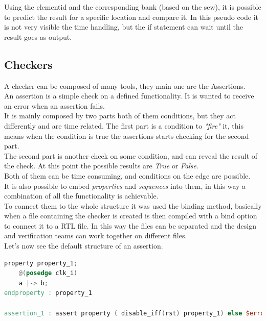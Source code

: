 Using the element\+id and the corresponding bank (based on the sew), it is possible to predict the result for a specific location and compare it. In this pseudo code it is not very visible the time handling, but the if statement can wait until the result goes as output.


\subsection{Checkers}
A checker can be composed of many tools, they main one are the Assertions.\\

An assertion is a simple check on a defined functionality. It is wanted to receive an error when an assertion fails.\\
It is mainly composed by two parts both of them conditions, but they act differently and are time related. The first part is a condition to \textit{"fire"} it, this means when the condition is true the assertions starts checking for the second part.\cite{verification-book-2016}\\

The second part is another check on some condition, and can reveal the result of the check. At this point the possible results are \textit{True} or \textit{False}.\\

Both of them can be time consuming, and conditions on the edge are possible.\\
It is also possible to embed \textit{properties} and \textit{sequences} into them, in this way  a combination of all the functionality is achievable.\\

To connect them to the whole structure it was used the binding method, basically when a file containing the checker is created is then compiled with a bind option to connect it to a RTL file. In this way the files can be separated and the design and verification teams can work together on different files.\\

Let's now see the default structure of an assertion.
\bigskip

\begin{lstlisting}[language=Verilog,style=verilog-style, backgroundcolor=\color{lyel_palette}, frame=tlb]
property property_1;
    @(posedge clk_i)
	a |-> b;
endproperty : property_1

assertion_1 : assert property ( disable_iff(rst) property_1) else $error("")

\end{lstlisting}
\bigskip

